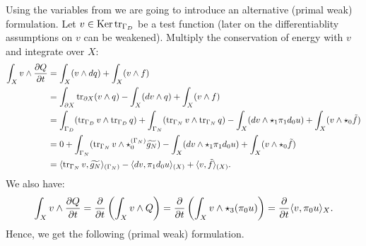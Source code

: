 \begin{discussion}
  Using the variables from
  we are going to introduce an alternative (primal weak) formulation.
  Let $v \in \mathop{\rm Ker}\nolimits \mathop{\rm tr}\nolimits_{\Gamma_D}$ be a test function
  (later on the differentiablity assumptions on $v$ can be weakened).
  Multiply the conservation of energy with $v$ and integrate over $X$:
  \begin{equation}
    \begin{split}
      \int_X v \wedge \frac{\partial Q}{\partial t}
      & = \int_X (v \wedge d q) + \int_X (v \wedge f) \\
      & = \int_{\partial X} \mathop{\rm tr}\nolimits_{\partial X} (v \wedge q)
        - \int_X (d v \wedge q)
        + \int_X (v \wedge f) \\
      & = \int_{\Gamma_D} (\mathop{\rm tr}\nolimits_{\Gamma_D} v \wedge \mathop{\rm tr}\nolimits_{\Gamma_D} q)
        + \int_{\Gamma_N} (\mathop{\rm tr}\nolimits_{\Gamma_N} v \wedge \mathop{\rm tr}\nolimits_{\Gamma_N} q)
        - \int_X (d v \wedge \star_1 \pi_1 d_0 u)
        + \int_X (v \wedge \star_0 \tilde{f}) \\
      & = 0
        + \int_{\Gamma_N}
          (\mathop{\rm tr}\nolimits_{\Gamma_N} v \wedge \star^{(\Gamma_N)}_0 \widetilde{g_N})
        - \int_X (d v \wedge \star_1 \pi_1 d_0 u)
        + \int_X (v \wedge \star_0 \tilde{f}) \\
      & = \langle\mathop{\rm tr}\nolimits_{\Gamma_N} v,\widetilde{g_N}\rangle_{(\Gamma_N)}
        - \langle d v,\pi_1 d_0 u\rangle_{(X)}
        + \langle v,\tilde{f}\rangle_{(X)}.
    \end{split}
  \end{equation}
  We also have:
  \begin{equation}
    \int_X v \wedge \frac{\partial Q}{\partial t}
    = \frac{\partial}{\partial t} \left(\int_X v \wedge Q\right)
    = \frac{\partial}{\partial t}
      \left(\int_X v \wedge \star_3 (\pi_0 u)\right)
    = \frac{\partial}{\partial t} \langle v,\pi_0 u\rangle_X.
  \end{equation}
  Hence, we get the following (primal weak) formulation.
\end{discussion}
